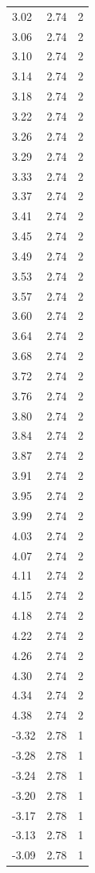 \begin{longtable}{lrr}
  3.02 & 2.74 & 2 \\
  3.06 & 2.74 & 2 \\
  3.10 & 2.74 & 2 \\
  3.14 & 2.74 & 2 \\
  3.18 & 2.74 & 2 \\
  3.22 & 2.74 & 2 \\
  3.26 & 2.74 & 2 \\
  3.29 & 2.74 & 2 \\
  3.33 & 2.74 & 2 \\
  3.37 & 2.74 & 2 \\
  3.41 & 2.74 & 2 \\
  3.45 & 2.74 & 2 \\
  3.49 & 2.74 & 2 \\
  3.53 & 2.74 & 2 \\
  3.57 & 2.74 & 2 \\
  3.60 & 2.74 & 2 \\
  3.64 & 2.74 & 2 \\
  3.68 & 2.74 & 2 \\
  3.72 & 2.74 & 2 \\
  3.76 & 2.74 & 2 \\
  3.80 & 2.74 & 2 \\
  3.84 & 2.74 & 2 \\
  3.87 & 2.74 & 2 \\
  3.91 & 2.74 & 2 \\
  3.95 & 2.74 & 2 \\
  3.99 & 2.74 & 2 \\
  4.03 & 2.74 & 2 \\
  4.07 & 2.74 & 2 \\
  4.11 & 2.74 & 2 \\
  4.15 & 2.74 & 2 \\
  4.18 & 2.74 & 2 \\
  4.22 & 2.74 & 2 \\
  4.26 & 2.74 & 2 \\
  4.30 & 2.74 & 2 \\
  4.34 & 2.74 & 2 \\
  4.38 & 2.74 & 2 \\
  -3.32 & 2.78 & 1 \\
  -3.28 & 2.78 & 1 \\
  -3.24 & 2.78 & 1 \\
  -3.20 & 2.78 & 1 \\
  -3.17 & 2.78 & 1 \\
  -3.13 & 2.78 & 1 \\
  -3.09 & 2.78 & 1 \\

\end{longtable}
